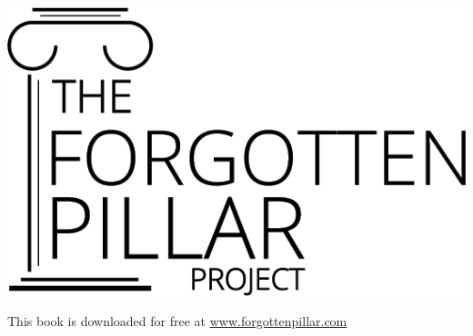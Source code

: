 {%
\noindent
\begin{minipage}{0.3\textwidth}
    \includegraphics[width=\linewidth]{images/logo-black.png}
\end{minipage}%
\hfill
\begin{minipage}{\dimexpr\linewidth-0.3\textwidth-0.2\textwidth-1em\relax}
    \raggedleft\footnotesize
    This book is downloaded for free at \href{https://forgottenpillar.com/book/the-forgotten-pillar}{www.forgottenpillar.com}
\end{minipage}%
\hfill
\begin{minipage}{0.125\textwidth}
    \centering
\end{minipage}
}

\pagebreak